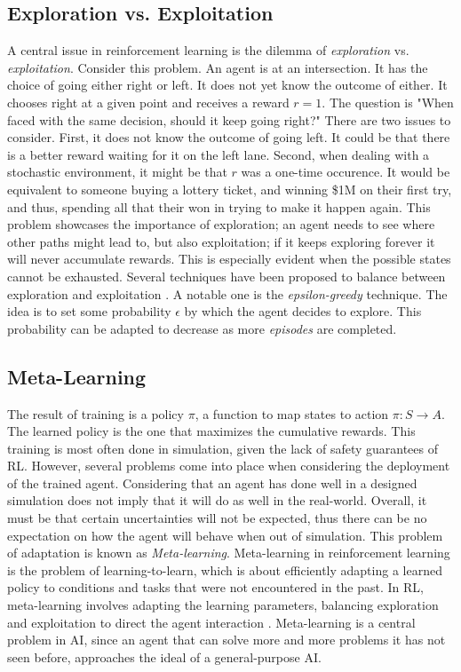\documentclass[a4paper,11pt]{article}
\theoremstyle{definition}
\begin{document}
\subsection{Exploration vs. Exploitation}
A central issue in reinforcement learning is the dilemma of \emph{exploration} vs. \emph{exploitation}. Consider this problem. An agent is at an intersection. It has the choice of going either right or left. 
It does not yet know the outcome of either. It chooses right at a given point and receives a reward $r=1$. The question is "When faced with the same decision, should it keep going right?" There are two issues to consider. 
First, it does not know the outcome of going left. It could be that there is a better reward waiting for it on the left lane. Second, when dealing with a stochastic environment, it might be that $r$ was a one-time occurence. 
It would be equivalent to someone buying a lottery ticket, and winning \$1M on their first try, and thus, spending all that their won in trying to make it happen again. This problem showcases the importance of exploration; an agent 
needs to see where other paths might lead to, but also exploitation; if it keeps exploring forever it will never accumulate rewards. This is especially evident when the possible states cannot be exhausted. Several techniques have been proposed 
to balance between exploration and exploitation \cite{Kaelbling1996ReinforcementLA}. A notable one is the \emph{epsilon-greedy} technique. The idea is to set some probability $\epsilon$ by which the agent decides to explore. This probability can be adapted 
to decrease as more \emph{episodes} are completed. 

\subsection{Meta-Learning}
The result of training is a policy $\pi$, a function to map states to action $\pi : S \rightarrow A$. The learned policy is the one that maximizes the cumulative rewards.
This training is most often done in simulation, given the lack of safety guarantees of RL. 
However, several problems come into place when considering the deployment of the trained agent. Considering that an agent has done well in 
a designed simulation does not imply that it will do as well in the real-world. Overall, it must be that certain uncertainties will not be expected, thus there can be no expectation on how the agent will behave 
when out of simulation. This problem of adaptation is known as \emph{Meta-learning}. Meta-learning in reinforcement learning is the problem of learning-to-learn, which is about efficiently
adapting a learned policy to conditions and tasks that were not encountered in the past. In RL, meta-learning
involves adapting the learning parameters, balancing exploration and exploitation to direct the
agent interaction \cite{gupta_meta-reinforcement_2018,schweighofer_meta-learning_2003}. Meta-learning is a central problem in AI, since an agent that can solve more
and more problems it has not seen before, approaches the ideal of a general-purpose AI. 
\end{document}
